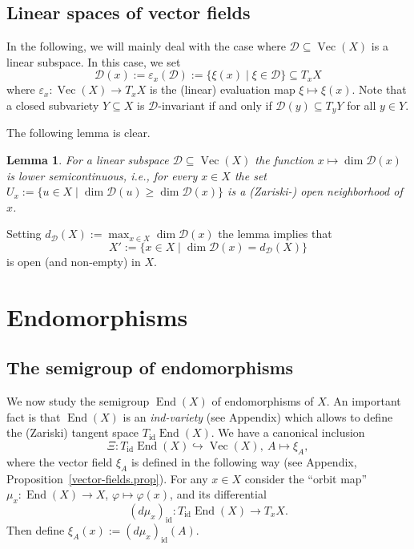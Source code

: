 \documentclass{amsart}
\newtheorem{lem}[thm]{Lemma}
\theoremstyle{definition}
\theoremstyle{remark}
\begin{document}
{\par\smallskip}
\subsection{Linear spaces of vector fields}
In the following, we will mainly deal with the case where ${\mathcal D} {\subseteq} \operatorname{Vec}(X)$ is a linear subspace. In this case, we set
$$
{\mathcal D}(x):= {\varepsilon}_{x}({\mathcal D}):=\{\xi(x) \mid \xi \in {\mathcal D}\} {\subseteq} T_{x}X
$$
where  ${\varepsilon}_{x}\colon \operatorname{Vec}(X) \to T_{x}X$ is the (linear) evaluation map $\xi\mapsto \xi(x)$. 
Note that a closed subvariety $Y {\subseteq} X$ is ${\mathcal D}$-invariant if and only if ${\mathcal D}(y) {\subseteq} T_{y}Y$ for all $y \in Y$.

The following lemma is clear.
\begin{lem}\label{lower-semi-cont.lem}
For a linear subspace ${\mathcal D} {\subseteq} \operatorname{Vec}(X)$ the function $x \mapsto \dim{\mathcal D}(x)$ is lower semicontinuous, i.e., for every $x\in X$ the set $U_{x}:=\{u \in X\mid \dim{\mathcal D}(u)\geq \dim{\mathcal D}(x)\}$ is a (Zariski-) open neighborhood of $x$.
\end{lem}
Setting $d_{\mathcal D}(X):=\max_{x\in X}\dim {\mathcal D}(x)$ the lemma implies that 
$$
X':=\{x\in X \mid \dim{\mathcal D}(x)=d_{\mathcal D}(X)\}
$$ 
is open (and non-empty) in $X$.

{\par\medskip}
\section{Endomorphisms}
\subsection{The semigroup of endomorphisms}\label{endo.subsec}
We now study the semigroup $\operatorname{End}(X)$ of endomorphisms  of $X$. An important fact is that $\operatorname{End}(X)$ is an {\it ind-variety} (see Appendix) which allows to define the (Zariski) tangent space $T_\operatorname{id}\operatorname{End}(X)$. We have a canonical inclusion
$$
\Xi\colon T_\operatorname{id}\operatorname{End}(X) {\hookrightarrow} \operatorname{Vec}(X), \  A \mapsto \xi_{A},
$$ 
where the vector field $\xi_{A}$ is defined in the following way (see Appendix, Proposition~\ref{vector-fields.prop}). For any $x \in X$ consider the ``orbit map'' $\mu_{x}\colon \operatorname{End}(X) \to X$, ${\varphi}\mapsto {\varphi}(x)$, and its differential 
$$
(d\mu_{x})_\operatorname{id}\colon T_\operatorname{id}\operatorname{End}(X) \to T_{x}X.
$$ 
Then define $\xi_{A}(x):=(d\mu_{x})_\operatorname{id}(A)$. 
\end{document}
